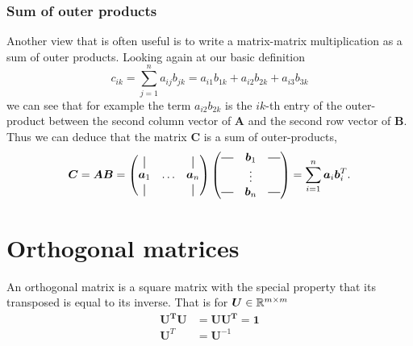 \subsubsection{Sum of outer products}
Another view that is often useful is to 
write a matrix-matrix multiplication as a sum of outer products.
Looking again at our basic definition
\begin{equation}
    c_{ik} = \sum_{j=1}^n a_{ij} b_{jk} = a_{i1} b_{1k} + a_{i2} b_{2k} + a_{i3} b_{3k}
\end{equation}
we can see that for example the term $a_{i2} b_{2k}$ is the $ik$-th entry of the outer-product between
the second column vector of $\bm{A}$ and the second row vector of $\bm{B}$.
Thus we can deduce that the matrix $\bm{C}$ is a sum of outer-products,
\begin{equation}
    \bm{C} = \bm{AB} = \begin{pmatrix}
    \vertbar &        & \vertbar \\
    \bm{a}_1 & \hdots & \bm{a}_n \\
    \vertbar &        & \vertbar 
    \end{pmatrix}
    \begin{pmatrix}
        \horzbar & \bm{b}_1 & \horzbar \\
                  & \vdots   &  \\
        \horzbar & \bm{b}_n &  \horzbar \\
    \end{pmatrix}  = 
    \sum_{i=1}^n \bm{a}_i \bm{b}_i^T.
\end{equation}

\section{Orthogonal matrices}

An orthogonal matrix is a square matrix with the special property that its transposed is equal to its inverse.
That is for $\bm{U} \in \mathbb{R}^{m \times m}$
\begin{align}
    \bm{U^T} \bm{U} &= \bm{U} \bm{U^T} = \bm{1} \\
    \bm{U}^T &= \bm{U}^{-1}
\end{align}

